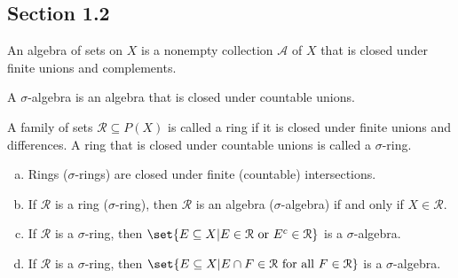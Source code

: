 \documentclass[10pt]{mypackage}
\begin{document}
\subsection{Section 1.2}%
\begin{definition}
  An algebra of sets on $X$ is a nonempty collection $\mathcal{A}$ of $X$ that is closed under finite unions and complements.\newline

  A $\sigma$-algebra is an algebra that is closed under countable unions.
\end{definition}
\begin{exercise}[Exercise 1]
  A family of sets $\mathcal{R}\subseteq P(X)$ is called a ring if it is closed under finite unions and differences. A ring that is closed under countable unions is called a $\sigma$-ring.
  \begin{enumerate}[(a)]
    \item Rings ($\sigma$-rings) are closed under finite (countable) intersections.
    \item If $\mathcal{R}$ is a ring ($\sigma$-ring), then $\mathcal{R}$ is an algebra ($\sigma$-algebra) if and only if $X\in \mathcal{R}$.
    \item If $\mathcal{R}$ is a $\sigma$-ring, then $\set{E\subseteq X | E\in \mathcal{R}\text{ or }E^{c}\in \mathcal{R}}$ is a $\sigma$-algebra.
    \item If $\mathcal{R}$ is a $\sigma$-ring, then $\set{E\subseteq X | E\cap F\in \mathcal{R}\text{ for all }F\in \mathcal{R}}$ is a $\sigma$-algebra.
  \end{enumerate}
\end{exercise}
\end{document}
